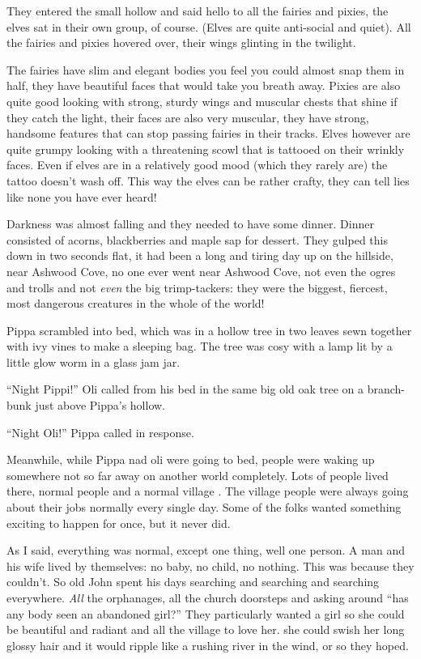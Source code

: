 They entered the small hollow and said hello to all the fairies and
pixies, the elves sat in their own group, of course. (Elves are quite
anti-social and quiet). All the fairies and pixies hovered over, their
wings glinting in the twilight.

The fairies have slim and elegant bodies you feel you could almost snap
them in half, they have beautiful faces that would take you breath away.
Pixies are also quite good looking with strong, sturdy wings and
muscular chests that shine if they catch the light, their faces are also
very muscular, they have strong, handsome features that can stop passing
fairies in their tracks. Elves however are quite grumpy looking with a
threatening scowl that is tattooed on their wrinkly faces. Even if elves
are in a relatively good mood (which they rarely are) the tattoo doesn't
wash off. This way the elves can be rather crafty, they can tell lies
like none you have ever heard!

Darkness was almost falling and they needed to have some dinner. Dinner
consisted of acorns, blackberries and maple sap for dessert. They gulped
this down in two seconds flat, it had been a long and tiring day up on
the hillside, near Ashwood Cove, no one ever went near Ashwood Cove, not
even the ogres and trolls and not \emph{even} the big trimp-tackers:
they were the biggest, fiercest, most dangerous creatures in the whole
of the world!

Pippa scrambled into bed, which was in a hollow tree in two leaves sewn
together with ivy vines to make a sleeping bag. The tree was cosy with a
lamp lit by a little glow worm in a glass jam jar.

``Night Pippi!'' Oli called from his bed in the same big old oak tree on
a branch-bunk just above Pippa's hollow.

``Night Oli!'' Pippa called in response.

Meanwhile, while Pippa nad oli were going to bed, people were waking up
somewhere not so far away on another world completely. Lots of people
lived there, normal people and a normal village . The village people
were always going about their jobs normally every single day. Some of
the folks wanted something exciting to happen for once, but it never
did.

As I said, everything was normal, except one thing, well one person. A
man and his wife lived by themselves: no baby, no child, no nothing.
This was because they couldn't. So old John spent his days searching and
searching and searching everywhere. \emph{All} the orphanages, all the
church doorsteps and asking around ``has any body seen an abandoned
girl?'' They particularly wanted a girl so she could be beautiful and
radiant and all the village to love her. she could swish her long glossy
hair and it would ripple like a rushing river in the wind, or so they
hoped.

